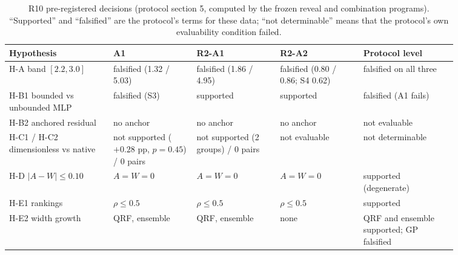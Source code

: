 \documentclass[11pt,a4paper]{article}
\begin{document}
\begin{table}[t]
\centering\footnotesize
\caption{R10 pre-registered decisions (protocol section 5, computed by the
frozen reveal and combination programs). ``Supported'' and ``falsified'' are
the protocol's terms for these data; ``not determinable'' means that the
protocol's own evaluability condition failed.}
\label{tab:r10decisions}
\begin{tabular}{p{0.20\linewidth}p{0.16\linewidth}p{0.16\linewidth}p{0.16\linewidth}p{0.18\linewidth}}
\toprule
Hypothesis & A1 & R2-A1 & R2-A2 & Protocol level \\
\midrule
H-A band $[2.2,3.0]$ & falsified (1.32 / 5.03) & falsified (1.86 / 4.95) & falsified (0.80 / 0.86; S4 0.62) & falsified on all three \\
\mbox{H-B1} bounded vs unbounded MLP & falsified (S3) & supported & supported & falsified (A1 fails) \\
\mbox{H-B2} anchored residual & no anchor & no anchor & no anchor & not evaluable \\
\mbox{H-C1} / \mbox{H-C2} dimensionless vs native & not supported ($+0.28$ pp, $p=0.45$) / 0 pairs & not supported (2 groups) / 0 pairs & not evaluable & not determinable \\
H-D $|A-W|\le 0.10$ & $A=W=0$ & $A=W=0$ & $A=W=0$ & supported (degenerate) \\
\mbox{H-E1} rankings & $\rho\le 0.5$ & $\rho\le 0.5$ & $\rho\le 0.5$ & supported \\
\mbox{H-E2} width growth & QRF, ensemble & QRF, ensemble & none & QRF and ensemble supported; GP falsified \\
\bottomrule
\end{tabular}
\end{table}
\end{document}
